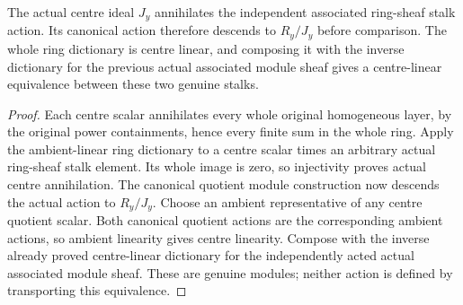 \begin{theorem}
\label{hir:real-domain-actual-normal-associated-ring-module-centre-equivalence}
\leanok
The actual centre ideal $J_y$ annihilates the independent associated
ring-sheaf stalk action. Its canonical action therefore descends to
$R_y/J_y$ before comparison. The whole ring dictionary is centre linear,
and composing it with the inverse dictionary for the previous actual
associated module sheaf gives a centre-linear equivalence between these
two genuine stalks.
\end{theorem}
\begin{proof}
Each centre scalar annihilates every whole original homogeneous layer,
by the original power containments, hence every finite sum in the whole
ring. Apply the ambient-linear ring dictionary to a centre scalar times
an arbitrary actual ring-sheaf stalk element. Its whole image is zero,
so injectivity proves actual centre annihilation. The canonical quotient
module construction now descends the actual action to $R_y/J_y$.
Choose an ambient representative of any centre quotient scalar. Both
canonical quotient actions are the corresponding ambient actions, so
ambient linearity gives centre linearity. Compose with the inverse
already proved centre-linear dictionary for the independently acted
actual associated module sheaf. These are genuine modules; neither
action is defined by transporting this equivalence.
\end{proof}

